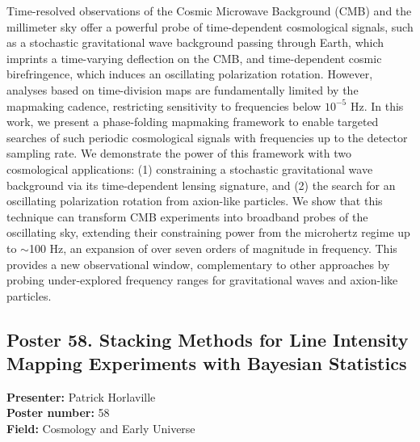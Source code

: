 Time-resolved observations of the Cosmic Microwave Background (CMB) and the millimeter sky offer a powerful probe of time-dependent cosmological signals, such as a stochastic gravitational wave background passing through Earth, which imprints a time-varying deflection on the CMB, and time-dependent cosmic birefringence, which induces an oscillating polarization rotation. However, analyses based on time-division maps are fundamentally limited by the mapmaking cadence, restricting sensitivity to frequencies below $10^{-5}$ Hz. In this work, we present a phase-folding mapmaking framework to enable targeted searches of such periodic cosmological signals with frequencies up to the detector sampling rate. We demonstrate the power of this framework with two cosmological applications: (1) constraining a stochastic gravitational wave background via its time-dependent lensing signature, and (2) the search for an oscillating polarization rotation from axion-like particles. We show that this technique can transform CMB experiments into broadband probes of the oscillating sky, extending their constraining power from the microhertz regime up to $\sim$100 Hz, an expansion of over seven orders of magnitude in frequency. This provides a new observational window, complementary to other approaches by probing under-explored frequency ranges for gravitational waves and axion-like particles.

\hypertarget{poster-abstract-talk-320}{}\label{poster-abstract-page-talk-320}
\subsection*{Poster 58. Stacking Methods for Line Intensity Mapping Experiments with Bayesian Statistics}
\textbf{Presenter:} Patrick Horlaville\\
\textbf{Poster number:} 58\\
\textbf{Field:} Cosmology and Early Universe

